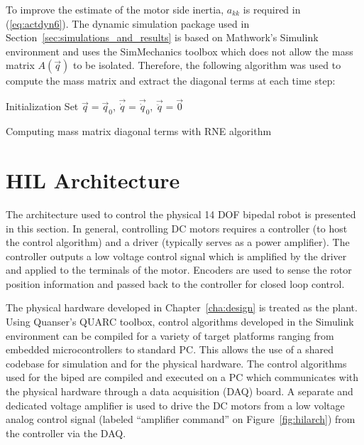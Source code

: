 To improve the estimate of the motor side inertia, $a_{kk}$ is required in (\ref{eq:actdyn6}). The dynamic simulation package used in Section~\ref{sec:simulations_and_results} is based on Mathwork's Simulink environment and uses the SimMechanics toolbox which does not allow the mass matrix $A(\vec{q})$ to be isolated. Therefore, the following algorithm was used to compute the mass matrix and extract the diagonal terms at each time step: 

\begin{algorithm}[H]
 \SetAlgoLined
 Initialization\;
 Set $\vec{q} = \vec{q}_0$, $\vec{\dot q} = \vec{\dot q}_0$, $\vec{\ddot q} = \vec{0}$\;
 \caption{Computing mass matrix diagonal terms with RNE algorithm}
 \label{alg:massdiag}
\end{algorithm}


\section{HIL Architecture} %
\label{sec:hil_architecture}
The architecture used to control the physical 14 DOF bipedal robot is presented in this section. In general, controlling DC motors requires a controller (to host the control algorithm) and a driver (typically serves as a power amplifier). The controller outputs a low voltage control signal which is amplified by the driver and applied to the terminals of the motor. Encoders are used to sense the rotor position information and passed back to the controller for closed loop  control. 

The physical hardware developed in Chapter~\ref{cha:design} is treated as the plant. Using Quanser's QUARC toolbox, control algorithms developed in the Simulink environment can be compiled for a variety of target platforms ranging from embedded microcontrollers to standard PC. This allows the use of a shared codebase for simulation and for the physical hardware. The control algorithms used for the biped are compiled and executed on a PC which communicates with the physical hardware through a data acquisition (DAQ) board. A separate and dedicated voltage amplifier is used to drive the DC motors from a low voltage analog control signal (labeled ``amplifier command'' on Figure~\ref{fig:hilarch}) from the controller via the DAQ. 

